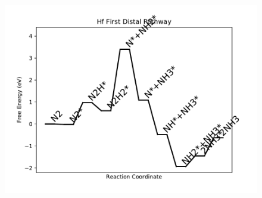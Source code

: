 \documentclass[journal=jacsat,manuscript=article]{achemso}
\begin{document}
\begin{figure}
\includegraphics[width=0.5\linewidth]{data/plots/Hf_distal_1.pdf}
\label{fig:Hf_distal_1}
\end{figure}
\end{document}
